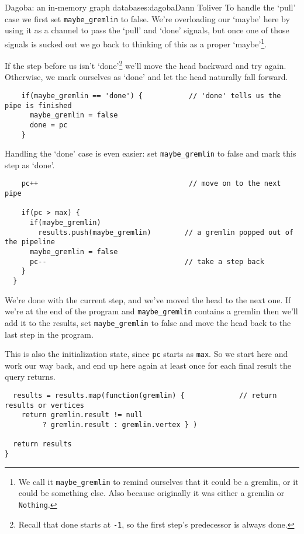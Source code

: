 \begin{aosachapter}{Dagoba: an in-memory graph database}{s:dagoba}{Dann Toliver}
To handle the `pull' case we first set \texttt{maybe\_gremlin} to false.
We're overloading our `maybe' here by using it as a channel to pass the
`pull' and `done' signals, but once one of those signals is sucked out
we go back to thinking of this as a proper `maybe'\footnote{We call it
  \texttt{maybe\_gremlin} to remind ourselves that it could be a
  gremlin, or it could be something else. Also because originally it was
  either a gremlin or \texttt{Nothing}.}.

If the step before us isn't `done'\footnote{Recall that done starts at
  \texttt{-1}, so the first step's predecessor is always done.} we'll
move the head backward and try again. Otherwise, we mark ourselves as
`done' and let the head naturally fall forward.

\begin{verbatim}
    if(maybe_gremlin == 'done') {           // 'done' tells us the pipe is finished
      maybe_gremlin = false
      done = pc
    }    
\end{verbatim}

Handling the `done' case is even easier: set \texttt{maybe\_gremlin} to
false and mark this step as `done'.

\begin{verbatim}
    pc++                                    // move on to the next pipe
    
    if(pc > max) {
      if(maybe_gremlin)
        results.push(maybe_gremlin)        // a gremlin popped out of the pipeline
      maybe_gremlin = false
      pc--                                 // take a step back
    }
  }
\end{verbatim}

We're done with the current step, and we've moved the head to the next
one. If we're at the end of the program and \texttt{maybe\_gremlin}
contains a gremlin then we'll add it to the results, set
\texttt{maybe\_gremlin} to false and move the head back to the last step
in the program.

This is also the initialization state, since \texttt{pc} starts as
\texttt{max}. So we start here and work our way back, and end up here
again at least once for each final result the query returns.

\begin{verbatim}
  results = results.map(function(gremlin) {             // return results or vertices
    return gremlin.result != null 
         ? gremlin.result : gremlin.vertex } )

  return results
}
\end{verbatim}


\end{aosachapter}
